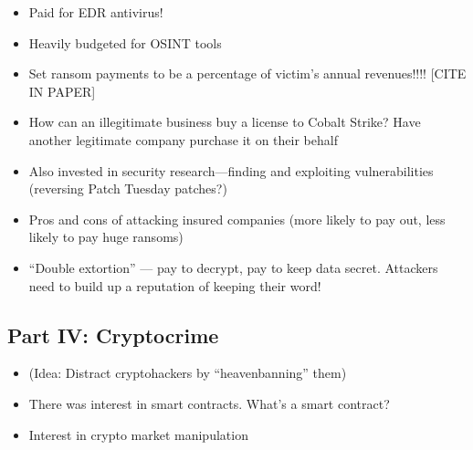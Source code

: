 \documentclass[11pt]{article}
\begin{document}
\begin{itemize}
    \item Paid for EDR antivirus!
    \item Heavily budgeted for OSINT tools
    \item Set ransom payments to be a percentage of victim's annual revenues!!!! [CITE IN PAPER]
    \item How can an illegitimate business buy a license to Cobalt Strike? Have another legitimate company purchase it on their behalf
    \item Also invested in security research---finding and exploiting vulnerabilities (reversing Patch Tuesday patches?)
    \item Pros and cons of attacking insured companies (more likely to pay out, less likely to pay huge ransoms)
    \item ``Double extortion'' --- pay to decrypt, pay to keep data secret. Attackers need to build up a reputation of keeping their word!
\end{itemize}

\subsection{Part IV: Cryptocrime}

\begin{itemize}
    \item (Idea: Distract cryptohackers by ``heavenbanning'' them)
    \item There was interest in smart contracts. What's a smart contract?
    \item Interest in crypto market manipulation
\end{itemize}
\end{document}
